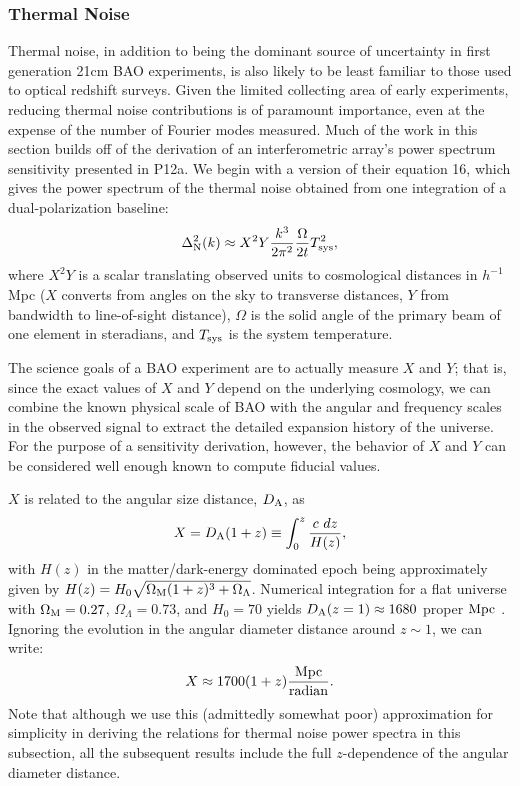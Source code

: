 \documentclass[10pt,iop]{emulateapj}
\begin{document}
\subsubsection{Thermal Noise}
\label{sec:thermal_noise}
Thermal noise, in addition to being the dominant source of uncertainty in first generation
21cm BAO experiments, is also likely to be
least familiar to those used to optical redshift surveys.
Given the limited collecting area of early experiments, reducing thermal noise
contributions is of paramount importance, even at the expense of the number of
Fourier modes measured.
Much of the work in this section builds off of the derivation of an interferometric array's
power spectrum sensitivity presented in P12a.  We begin with a version of their 
equation 16, which gives
the power spectrum of the thermal noise obtained from one integration of a
dual-polarization baseline:
\begin{equation}
\label{eq:single_baseline_sensitivity}
\Delta^2_{\rm N}(k) \approx X^2Y\frac{k^3}{2\pi^2}\frac{\Omega}{2t}T_{\rm sys}^2,
\end{equation}
where $X^2Y$ is a scalar translating observed units to cosmological distances in $h^{-1}$Mpc
($X$ converts from angles on the sky to transverse distances, $Y$ from bandwidth to
line-of-sight distance), $\Omega$ is the solid angle of the primary beam of one element
in steradians, and $T_{\rm sys}$ is the system temperature.

The science goals of a BAO experiment are to actually measure $X$ and $Y$; that is, since
the exact values of $X$ and $Y$ depend on the underlying cosmology, we can combine the
known physical scale of BAO with the angular and frequency scales in the observed signal to extract
the detailed expansion history of the universe.  For the purpose of a sensitivity derivation,
however, the behavior of $X$ and $Y$ can be considered well enough known to compute fiducial
values.

$X$ is related to the angular size distance, $D_{\rm A}$, as
\begin{equation}
\label{eq:X}
    X=D_{\rm A}(1+z)\equiv\int_0^z{\frac{c\ dz}{H(z)}},
\end{equation}
with $H(z)$ in the matter/dark-energy dominated epoch being approximately given by 
$H(z)=H_0\sqrt{\Omega_{\rm M}(1+z)^3+\Omega_\Lambda}$.  Numerical integration for a flat universe
with $\Omega_{\rm M}=0.27$, $\Omega_\Lambda=0.73$, and $H_0=70$ yields $D_{\rm A}(z=1)\approx1680$ 
proper $\rm{Mpc}$ \citep{wright2006}.  Ignoring the evolution in the 
angular diameter distance around $z\sim1$, we can write:
\begin{equation}
\label{eq:X_approx}
    X\approx 1700 (1+z) \frac{\rm Mpc}{\rm radian}.
\end{equation}
Note that although we use this (admittedly somewhat poor) approximation 
for simplicity
in deriving the relations for thermal noise
power spectra in this subsection, all the subsequent results include the full $z$-dependence of the
angular diameter distance.
\end{document}
